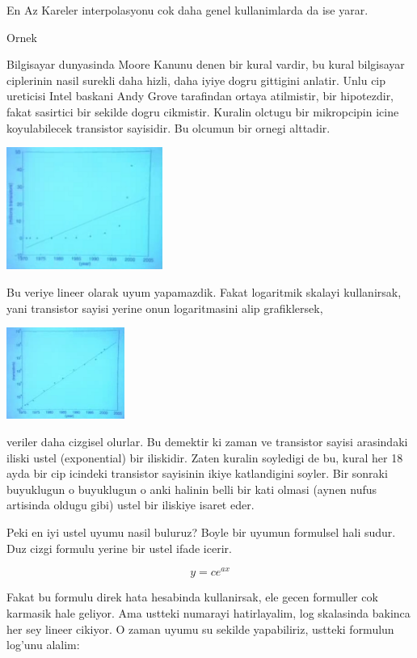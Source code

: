 \documentclass[12pt,fleqn]{article}
\begin{document}
En Az Kareler interpolasyonu cok daha genel kullanimlarda da ise yarar. 

Ornek

Bilgisayar dunyasinda Moore Kanunu denen bir kural vardir, bu kural
bilgisayar ciplerinin nasil surekli daha hizli, daha iyiye dogru gittigini
anlatir. Unlu cip ureticisi Intel baskani Andy Grove tarafindan ortaya
atilmistir, bir hipotezdir, fakat sasirtici bir sekilde dogru
cikmistir. Kuralin olctugu bir mikropcipin icine koyulabilecek transistor
sayisidir. Bu olcumun bir ornegi alttadir. 

\includegraphics[height=4cm]{9_7.png}

Bu veriye lineer olarak uyum yapamazdik. Fakat logaritmik skalayi
kullanirsak, yani transistor sayisi yerine onun logaritmasini alip
grafiklersek, 

\includegraphics[height=3cm]{9_8.png}

veriler daha cizgisel olurlar. Bu demektir ki zaman ve transistor sayisi
arasindaki iliski ustel (exponential) bir iliskidir. Zaten kuralin
soyledigi de bu, kural her 18 ayda bir cip icindeki transistor sayisinin
ikiye katlandigini soyler. Bir sonraki buyuklugun o buyuklugun o anki
halinin belli bir kati olmasi (aynen nufus artisinda oldugu gibi) ustel bir
iliskiye isaret eder. 

Peki en iyi ustel uyumu nasil buluruz? Boyle bir uyumun formulsel hali
sudur. Duz cizgi formulu yerine bir ustel ifade icerir. 

\[ y = ce^{ax} \]

Fakat bu formulu direk hata hesabinda kullanirsak, ele gecen formuller cok
karmasik hale geliyor. Ama ustteki numarayi hatirlayalim, log skalasinda
bakinca her sey lineer cikiyor. O zaman uyumu su sekilde yapabiliriz,
ustteki formulun log'unu alalim:
\end{document}
